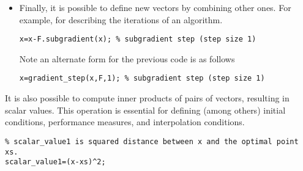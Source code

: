 \documentclass[11pt,a4paper]{article}
\begin{document}
\begin{enumerate}
\begin{itemize}
			\item Finally, it is possible to define new vectors by combining other ones. For example, for describing the iterations of an algorithm.\\[-1cm]
			\begin{lstlisting}
x=x-F.subgradient(x); % subgradient step (step size 1)
			\end{lstlisting}
			Note an alternate form for the previous code is as follows\\[-1cm]
			\begin{lstlisting}
x=gradient_step(x,F,1); % subgradient step (step size 1)
			\end{lstlisting}
		\end{itemize}
		It is also possible to compute inner products of pairs of vectors, resulting in scalar values. This operation is essential for defining (among others) initial conditions, performance measures, and interpolation conditions.\\[-1cm]
		\begin{lstlisting}
% scalar_value1 is squared distance between x and the optimal point xs.
scalar_value1=(x-xs)^2;


\end{lstlisting}
\end{enumerate}
\end{document}
